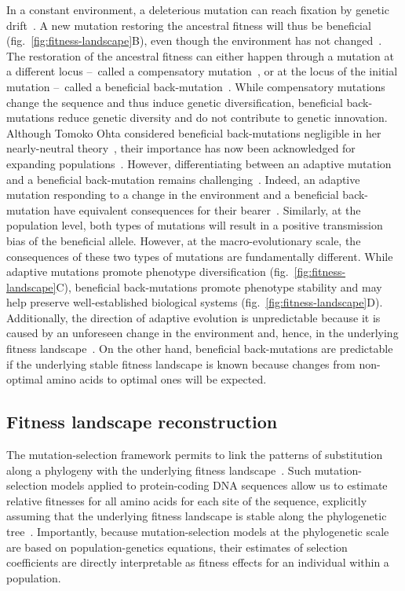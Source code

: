 \documentclass[12pt]{article}
\begin{document}
In a constant environment, a deleterious mutation can reach fixation by genetic drift~\cite{Ohta1992}.
A new mutation restoring the ancestral fitness will thus be beneficial (fig.~\ref{fig:fitness-landscape}B), even though the environment has not changed~\cite{hartl_compensatory_1996, sella_application_2005, mustonen_fitness_2009, cvijovic_fate_2015}.
The restoration of the ancestral fitness can either happen through a mutation at a different locus –~called a compensatory mutation~\cite{hartl_compensatory_1996, mustonen_fitness_2009}, or at the locus of the initial mutation –~called a beneficial back-mutation~\cite{piganeau_estimating_2003, charlesworth_other_2007}.
While compensatory mutations change the sequence and thus induce genetic diversification, beneficial back-mutations reduce genetic diversity and do not contribute to genetic innovation.
Although Tomoko Ohta considered beneficial back-mutations negligible in her nearly-neutral theory~\cite{Ohta1992}, their importance has now been acknowledged for expanding populations~\cite{charlesworth_other_2007}.
However, differentiating between an adaptive mutation and a beneficial back-mutation remains challenging~\cite{chi_detecting_2020}.
Indeed, an adaptive mutation responding to a change in the environment and a beneficial back-mutation have equivalent consequences for their bearer~\cite{charlesworth_other_2007}.
Similarly, at the population level, both types of mutations will result in a positive transmission bias of the beneficial allele.
However, at the macro-evolutionary scale, the consequences of these two types of mutations are fundamentally different.
While adaptive mutations promote phenotype diversification (fig.~\ref{fig:fitness-landscape}C), beneficial back-mutations promote phenotype stability and may help preserve well-established biological systems (fig.~\ref{fig:fitness-landscape}D).
Additionally, the direction of adaptive evolution is unpredictable because it is caused by an unforeseen change in the environment and, hence, in the underlying fitness landscape~\cite{bazykin_changing_2015}.
On the other hand, beneficial back-mutations are predictable if the underlying stable fitness landscape is known because changes from non-optimal amino acids to optimal ones will be expected.

\subsection*{Fitness landscape reconstruction}
The mutation-selection framework permits to link the patterns of substitution along a phylogeny with the underlying fitness landscape~\cite{halpern_evolutionary_1998, mccandlish_modeling_2014}.
Such mutation-selection models applied to protein-coding DNA sequences allow us to estimate relative fitnesses for all amino acids for each site of the sequence, explicitly assuming that the underlying fitness landscape is stable along the phylogenetic tree~\cite{rodrigue_mechanistic_2010, tamuri_estimating_2012, rodrigue_detecting_2017}.
Importantly, because mutation-selection models at the phylogenetic scale are based on population-genetics equations, their estimates of selection coefficients are directly interpretable as fitness effects for an individual within a population.
\end{document}
